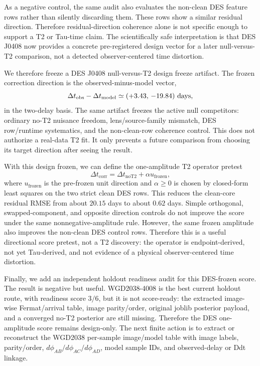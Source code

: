 \documentclass[11pt]{article}
\begin{document}
As a negative control, the same audit also evaluates the non-clean DES feature
rows rather than silently discarding them.  These rows show a similar residual
direction.  Therefore residual-direction coherence alone is not specific enough
to support a T2 or Tau-time claim.  The scientifically safe interpretation is
that DES J0408 now provides a concrete pre-registered design vector for a later
null-versus-T2 comparison, not a detected observer-centered time distortion.

We therefore freeze a DES J0408 null-versus-T2 design freeze artifact.  The frozen
correction direction is the observed-minus-model vector,
\[
  \Delta t_{\mathrm{obs}}-\Delta t_{\mathrm{model}}
  \simeq (+3.43,\,-19.84)\ {\rm days},
\]
in the two-delay basis.  The same artifact freezes the active null competitors:
ordinary no-T2 nuisance freedom, lens/source-family mismatch, DES row/runtime
systematics, and the non-clean-row coherence control.  This does not authorize a
real-data T2 fit.  It only prevents a future comparison from choosing its target
direction after seeing the result.

With this design frozen, we can define the one-amplitude T2 operator pretest
\[
  \Delta t_{\mathrm{corr}} =
  \Delta t_{\mathrm{noT2}} + \alpha u_{\mathrm{frozen}},
\]
where \(u_{\mathrm{frozen}}\) is the pre-frozen unit direction and
\(\alpha \geq 0\) is chosen by closed-form least squares on the two strict clean
DES rows.  This reduces the clean-core residual RMSE from about \(20.15\) days
to about \(0.62\) days.  Simple orthogonal, swapped-component, and opposite
direction controls do not improve the score under the same nonnegative-amplitude
rule.  However, the same frozen amplitude also improves the non-clean DES
control rows.  Therefore this is a useful directional score pretest, not a T2
discovery: the operator is endpoint-derived, not yet Tau-derived, and not
evidence of a physical observer-centered time distortion.

Finally, we add an independent holdout readiness audit for this DES-frozen score.  The
result is negative but useful.  WGD2038-4008 is the best current holdout route,
with readiness score \(3/6\), but it is not score-ready: the extracted
image-wise Fermat/arrival table, image parity/order, original joblib posterior
payload, and a converged no-T2 posterior are still missing.  Therefore the DES
one-amplitude score remains design-only.  The next finite action is to extract
or reconstruct the WGD2038 per-sample image/model table with image labels,
parity/order, \(d\phi_{AB}/d\phi_{AC}/d\phi_{AD}\), model sample IDs, and
observed-delay or Ddt linkage.
\end{document}
